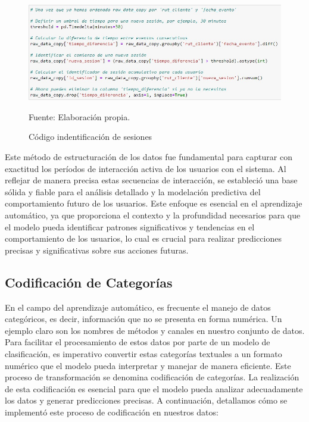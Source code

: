\begin{figure}[H]
    \begin{minipage}[t]{0.9\textwidth}
        \caption{Código indentificación de sesiones}
        \label{identificación_sesiones}        
    \end{minipage}

    \vspace{10pt}

    \begin{minipage}[b]{1\textwidth}
        \centering
        \includegraphics[width=\textwidth]{img/Código identificación sesiones.jpg}        
    \end{minipage}

    \begin{minipage}[t]{0.9\textwidth}
        Fuente: Elaboración propia.
    \end{minipage}
\end{figure}

Este método de estructuración de los datos fue fundamental para capturar con exactitud los períodos de interacción activa de los usuarios con el sistema. Al reflejar de manera precisa estas secuencias de interacción, se estableció una base sólida y fiable para el análisis detallado y la modelación predictiva del comportamiento futuro de los usuarios. Este enfoque es esencial en el aprendizaje automático, ya que proporciona el contexto y la profundidad necesarios para que el modelo pueda identificar patrones significativos y tendencias en el comportamiento de los usuarios, lo cual es crucial para realizar predicciones precisas y significativas sobre sus acciones futuras.

\subsection{Codificación de Categorías}

En el campo del aprendizaje automático, es frecuente el manejo de datos categóricos, es decir, información que no se presenta en forma numérica. Un ejemplo claro son los nombres de métodos y canales en nuestro conjunto de datos. Para facilitar el procesamiento de estos datos por parte de un modelo de clasificación, es imperativo convertir estas categorías textuales a un formato numérico que el modelo pueda interpretar y manejar de manera eficiente. Este proceso de transformación se denomina codificación de categorías. La realización de esta codificación es esencial para que el modelo pueda analizar adecuadamente los datos y generar predicciones precisas. A continuación, detallamos cómo se implementó este proceso de codificación en nuestros datos:

